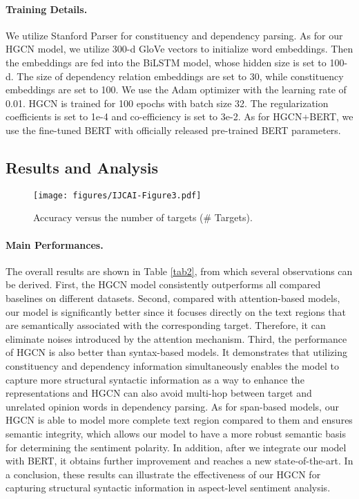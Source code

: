 \documentclass{article}
\begin{document}
\paragraph{Training Details.}
We utilize Stanford Parser \cite{manning2014stanford} for constituency and dependency parsing. As for our HGCN model, we utilize 300-d GloVe vectors \cite{pennington2014glove} to initialize word embeddings. Then the embeddings are fed into the BiLSTM model, whose hidden size is set to 100-d. The size of dependency relation embeddings are set to 30, while constituency embeddings are set to 100. We use the Adam optimizer with the learning rate of 0.01. HGCN is trained for 100 epochs with batch size 32. The regularization coefficients  is set to 1e-4 and co-efficiency  is set to 3e-2. As for HGCN+BERT, we use the fine-tuned BERT with officially released pre-trained BERT parameters.

\subsection{Results and Analysis}
\begin{figure}[t]
	\centering
	\texttt{[image: figures/IJCAI-Figure3.pdf]} \caption{Accuracy versus the number of targets (\# Targets).}
	\label{fig3}
\end{figure}

\paragraph{Main Performances.}
The overall results are shown in Table \ref{tab2}, from which several observations can be derived. First, the HGCN model consistently outperforms all compared baselines on different datasets. Second, compared with attention-based models, our model is significantly better since it focuses directly on the text regions that are semantically associated with the corresponding target. Therefore, it can eliminate noises introduced by the attention mechanism. Third, the performance of HGCN is also better than syntax-based models. It demonstrates that utilizing constituency and dependency information simultaneously enables the model to capture more structural syntactic information as a way to enhance the representations and HGCN can also avoid multi-hop between target and unrelated opinion words in dependency parsing. As for span-based models, our HGCN is able to model more complete text region compared to them and ensures semantic integrity, which allows our model to have a more robust semantic basis for determining the sentiment polarity. In addition, after we integrate our model with BERT, it obtains further improvement and reaches a new state-of-the-art. In a conclusion, these results can illustrate the effectiveness of our HGCN for capturing structural syntactic information in aspect-level sentiment analysis.
\end{document}
